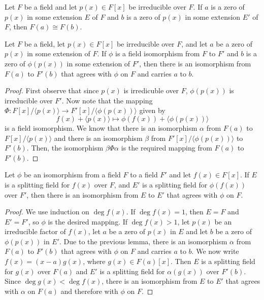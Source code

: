 \begin{corollary}
	Let $F$ be a field and let $p(x)\in F[x]$ be irreducible over $F$. If $a$ is a zero of $p(x)$ in some extension $E$ of $F$ and $b$ is a zero of $p(x)$ in some extension $E'$ of $F$, then $F(a)\cong F(b)$.
\end{corollary}

\begin{lemma}
	Let $F$ be a field, let $p(x)\in F[x]$ be irreducible over $F$, and let $a$ be a zero of $p(x)$ in some extension of $F$. If $\phi$ is a field isomorphism from $F$ to $F'$ and $b$ is a zero of $\phi(p(x))$ in some extension of $F'$, then there is an isomorphism from $F(a)$ to $F'(b)$ that agrees with $\phi$ on $F$ and carries $a$ to $b$.
\end{lemma}
\begin{proof}
	First observe that since $p(x)$ is irredicuble over $F$, $\phi(p(x))$ is irreducible over $F'$. Now note that the mapping $\Phi:F[x]/\langle p(x)\rangle\to F'[x]/\langle\phi(p(x))\rangle$ given by
	$$
	f(x)+\langle p(x)\rangle\mapsto\phi(f(x))+\langle\phi(p(x))\rangle
	$$
	is a field isomorphism. We know that there is an isomorphism $\alpha$ from $F(a)$ to $F[x]/\langle p(x)\rangle$ and there is an isomorphism $\beta$ from $F'[x]/\langle\phi(p(x))\rangle$ to $F'(b)$. Then, the isomorphism $\beta\Phi\alpha$ is the required mapping from $F(a)$ to $F'(b)$.
\end{proof}

\begin{proposition}
	Let $\phi$ be an isomorphism from a field $F$ to a field $F'$ and let $f(x)\in F[x]$. If $E$ is a splitting field for $f(x)$ over $F$, and $E'$ is a splitting field for $\phi(f(x))$ over $F'$, then there is an isomorphism from $E$ to $E'$ that agrees with $\phi$ on $F$.
\end{proposition}
\begin{proof}
	We use induction on $\deg f(x)$. If $\deg f(x)=1$, then $E=F$ and $E'=F'$, so $\phi$ is the desired mapping. If $\deg f(x)>1$, let $p(x)$ be an irreducible factor of $f(x)$, let $a$ be a zero of $p(x)$ in $E$ and let $b$ be a zero of $\phi(p(x))$ in $E'$. Due to the previous lemma, there is an isomorphism $\alpha$ from $F(a)$ to $F'(b)$ that agrees with $\phi$ on $F$ and carries $a$ to $b$. We now write $f(x)=(x-a)g(x)$, where $g(x)\in F(a)[x]$. Then $E$ is a splitting field for $g(x)$ over $F(a)$ and $E'$ is a splitting field for $\alpha(g(x))$ over $F'(b)$. Since $\deg g(x)<\deg f(x)$, there is an isomorphism from $E$ to $E'$ that agrees with $\alpha$ on $F(a)$ and therefore with $\phi$ on $F$.
\end{proof}

